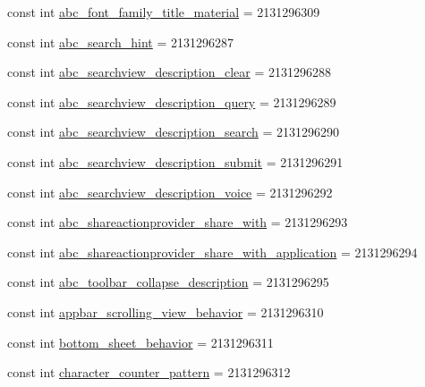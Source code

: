 \begin{CompactItemize}
\item 
const int \hyperlink{class__2doo_1_1_droid_1_1_resource_1_1_string_65086826385cb9e415be430e77c969f5}{abc\_\-font\_\-family\_\-title\_\-material} = 2131296309
\item 
const int \hyperlink{class__2doo_1_1_droid_1_1_resource_1_1_string_2c484437c625418d4adcb03b43192331}{abc\_\-search\_\-hint} = 2131296287
\item 
const int \hyperlink{class__2doo_1_1_droid_1_1_resource_1_1_string_18d93ab2ac92cce4997bfc2871e0071f}{abc\_\-searchview\_\-description\_\-clear} = 2131296288
\item 
const int \hyperlink{class__2doo_1_1_droid_1_1_resource_1_1_string_e44df098b5bd3408a3bfd2b6daa0be57}{abc\_\-searchview\_\-description\_\-query} = 2131296289
\item 
const int \hyperlink{class__2doo_1_1_droid_1_1_resource_1_1_string_350f0cc306bd9d64b44399bf488f1f65}{abc\_\-searchview\_\-description\_\-search} = 2131296290
\item 
const int \hyperlink{class__2doo_1_1_droid_1_1_resource_1_1_string_de1a63fe37f3cc902a5916891e4547a7}{abc\_\-searchview\_\-description\_\-submit} = 2131296291
\item 
const int \hyperlink{class__2doo_1_1_droid_1_1_resource_1_1_string_85c33b25a9f702aa511f0c4cad77096b}{abc\_\-searchview\_\-description\_\-voice} = 2131296292
\item 
const int \hyperlink{class__2doo_1_1_droid_1_1_resource_1_1_string_1c9a14dd54a85989dbe7a931356fe558}{abc\_\-shareactionprovider\_\-share\_\-with} = 2131296293
\item 
const int \hyperlink{class__2doo_1_1_droid_1_1_resource_1_1_string_8c864853bf4145ff596d0994d7aefa1c}{abc\_\-shareactionprovider\_\-share\_\-with\_\-application} = 2131296294
\item 
const int \hyperlink{class__2doo_1_1_droid_1_1_resource_1_1_string_99a3a21e774094f6288de5a2624592d9}{abc\_\-toolbar\_\-collapse\_\-description} = 2131296295
\item 
const int \hyperlink{class__2doo_1_1_droid_1_1_resource_1_1_string_8a2f67392b5b054e43f6a25914f5cb8e}{appbar\_\-scrolling\_\-view\_\-behavior} = 2131296310
\item 
const int \hyperlink{class__2doo_1_1_droid_1_1_resource_1_1_string_6d8964764d203b36494a1e181f357091}{bottom\_\-sheet\_\-behavior} = 2131296311
\item 
const int \hyperlink{class__2doo_1_1_droid_1_1_resource_1_1_string_4bf5791a0319902baf911088d1dd3b6a}{character\_\-counter\_\-pattern} = 2131296312

\end{CompactItemize}
